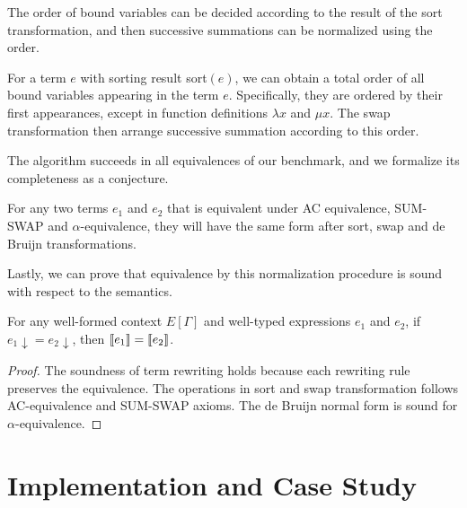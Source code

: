 \documentclass[runningheads]{llncs}
\begin{document}
The order of bound variables can be decided according to the result of the sort transformation, and then successive summations can be normalized using the order.
\begin{definition}
    For a term $e$ with sorting result sort$(e)$, we can obtain a total order of all bound variables appearing in the term $e$. Specifically, they are ordered by their first appearances, except in function definitions $\lambda x$ and $\mu x$.
    The swap transformation then arrange successive summation according to this order.
\end{definition}

The algorithm succeeds in all equivalences of our benchmark, and we formalize its completeness as a conjecture.
\begin{conjecture}
    For any two terms $e_1$ and $e_2$ that is equivalent under AC equivalence, SUM-SWAP and $\alpha$-equivalence, they will have the same form after sort, swap and de Bruijn transformations.
\end{conjecture}






Lastly, we can prove that equivalence by this normalization procedure is sound with respect to the semantics. 
\begin{theorem}[soundness]
    For any well-formed context $E[\Gamma]$ and well-typed expressions $e_1$ and $e_2$, if $e_1\downarrow = e_2\downarrow$, then ${\llbracket e_1 \rrbracket} = {\llbracket e_2 \rrbracket}$.
\end{theorem}
\begin{proof}
    The soundness of term rewriting holds because each rewriting rule preserves the equivalence. The operations in sort and swap transformation follows AC-equivalence and SUM-SWAP axioms. The de Bruijn normal form is sound for $\alpha$-equivalence.
\end{proof}







\section{Implementation and Case Study}
\end{document}

